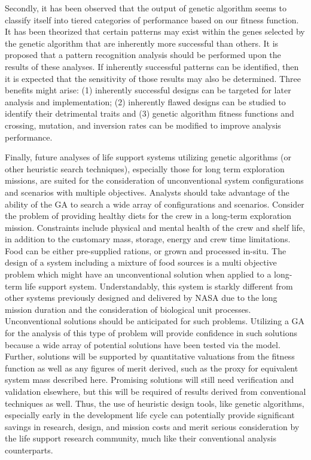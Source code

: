 \documentclass[submit]{aiaa}
\begin{document}
Secondly, it has been observed that the output of genetic algorithm seems to classify itself into tiered categories of performance based on our fitness function.
It has been theorized that certain patterns may exist within the genes selected by the genetic algorithm that are inherently more successful than others.
It is proposed that a pattern recognition analysis should be performed upon the results of these analyses. 
If inherently successful patterns can be identified, then it is expected that the sensitivity of those results may also be determined. 
Three benefits might arise: (1) inherently successful designs can be targeted for later analysis and implementation; (2) inherently flawed designs can be studied to identify their detrimental traits and (3) genetic algorithm fitness functions and crossing, mutation, and inversion rates can be modified to improve analysis performance.

Finally, future analyses of life support systems utilizing genetic algorithms (or other heuristic search techniques), especially those for long term exploration missions, are suited for the consideration of unconventional system configurations and scenarios with multiple objectives. 
Analysts should  take advantage of the ability of the GA to search a wide array of configurations and scenarios.
Consider the problem of providing healthy diets for the crew in a long-term exploration mission.
Constraints include physical and mental health of the crew and shelf life, in addition to the customary mass, storage, energy and crew time limitations.
Food can be either pre-supplied rations, or grown and processed in-situ.
The design of a system including a mixture of food sources is a multi objective problem which might have an unconventional solution when applied to a long-term life support system.
Understandably, this system is starkly different from other systems previously designed and delivered by NASA due to the long mission duration and the consideration of biological unit processes.
Unconventional solutions should be anticipated for such problems. 
Utilizing a GA for the analysis of this type of problem will provide confidence in such solutions because a wide array of potential solutions have been tested via the model.
Further, solutions will be supported by quantitative valuations from the fitness function as well as any figures of merit derived, such as the proxy for equivalent system mass described here.
Promising solutions will still need verification and validation elsewhere, but this will be required of results derived from conventional techniques as well.
Thus, the use of heuristic design tools, like genetic algorithms, especially early in the development life cycle can potentially provide significant savings in research, design, and mission costs and merit serious consideration by the life support research community, much like their conventional analysis counterparts.
 


\end{document}
